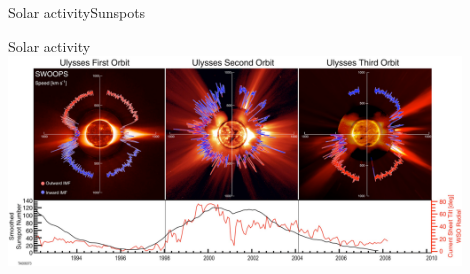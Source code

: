 \begin{frame}[c]{Solar activity}{Sunspots}
	\centering
\end{frame}
\begin{frame}[c]{Solar activity}{}
	\includegraphics[width=0.9\textwidth]{../figures_of_others/images/McComas2008_Ulysses_orbit_.png}
\end{frame}

